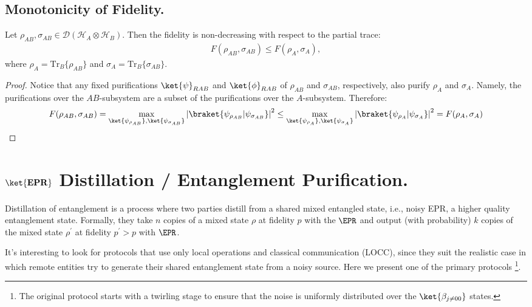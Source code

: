 \documentclass[12pt,a4paper]{article}
\begin{document}
\subsection{Monotonicity of Fidelity.}
Let $\rho_{AB}, \sigma_{AB} \in \mathcal{D}(\mathcal{H}_A \otimes \mathcal{H}_B)$. Then the fidelity is non-decreasing with respect to the partial trace:
\begin{equation*}
  \begin{split}
  F(\rho_{AB}, \sigma_{AB}) \leq F(\rho_A, \sigma_A),
  \end{split}
\end{equation*}
where $\rho_A = \mathrm{Tr}_B\{\rho_{AB}\}$ and $\sigma_A = \mathrm{Tr}_B\{\sigma_{AB}\}$.

\begin{proof}

Notice that any fixed purifications $\ket{\psi}_{RAB}$ and $\ket{\phi}_{RAB}$ of $\rho_{AB}$ and $\sigma_{AB}$, respectively, also purify $\rho_A$ and $\sigma_A$. Namely, the purifications over the $AB$-subsystem are a subset of the purifications over the $A$-subsystem. Therefore:
  \begin{equation*}
    \begin{split}
      F(\rho_{AB}, \sigma_{AB}) = \max_{\ket{\psi_{\rho_{AB}}}, \ket{\psi_{\sigma_{AB}}}} \left| \braket{\psi_{\rho_{AB}}|\psi_{\sigma_{AB}}} \right|^2  \le \max_{\ket{\psi_{\rho_{A}}}, \ket{\psi_{\sigma_{A}}}} \left| \braket{\psi_{\rho_{A}}|\psi_{\sigma_{A}}} \right|^2 =F(\rho_{A}, \sigma_{A})
    \end{split}
  \end{equation*}
\end{proof}


\section{ $ \ket{\mathbf{EPR} }$ Distillation / Entanglement Purification.  }
Distillation of entanglement is a process where two parties distill from a shared mixed entangled state, i.e., noisy EPR, a higher quality entanglement state. Formally, they take $n$ copies of a mixed state $\rho$ at fidelity $p$ with the $\EPR$ and output (with probability) $k$ copies of the mixed state $\rho^{\prime}$ at fidelity $p^\prime > p$ with $\EPR$. 

It's interesting to look for protocols that use only local operations and classical communication (LOCC), since they suit the realistic case in which remote entities try to generate their shared entanglement state from a noisy source. Here we present one of the primary protocols \cite{Bennett_1996}\footnote{The original protocol starts with a twirling stage to ensure that the noise is uniformly distributed over the $\ket{\beta_{j \neq 00}}$ states.}.
\end{document}
